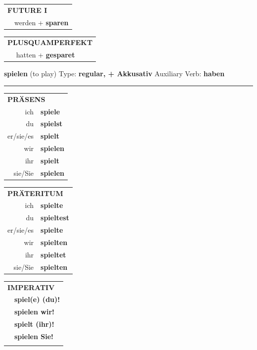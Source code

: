 \documentclass[10pt,a4paper]{revtex4-2}
\begin{document}
\begin{verbbox-acc}
\begin{tabular}{rl}
    \multicolumn{2}{l}{\textbf{FUTURE I} }\\
  &  werden + \textbf{sparen}\\
 
  \end{tabular}
\hfill
   \begin{tabular}{rl}
      \multicolumn{2}{l}{\textbf{PLUSQUAMPERFEKT}}\\
  &  hatten + \textbf{gesparet}\\
  \end{tabular}
  
  \vspace{-5pt}


\end{verbbox-acc}


\begin{verbbox-acc}
    {\Large \bf spielen} (to play) \hfill Type: \textbf{regular, + Akkusativ} \hfill Auxiliary Verb: \textbf{haben} 
    
     \vspace{5pt}

    \hrule
    
    \vspace{5pt}

  \begin{tabular}{rl}
     \multicolumn{2}{l}{\textbf{PRÄSENS} }\\
    ich & \textbf{spiele}\\
    du & \textbf{spielst}\\
    er/sie/es & \textbf{spielt}\\
    wir & \textbf{spielen}\\
    ihr & \textbf{spielt}\\
    sie/Sie & \textbf{spielen}\\
  \end{tabular}
  \hfill
     \begin{tabular}{rl}
    \multicolumn{2}{l}{\textbf{PRÄTERITUM} }\\
    ich & \textbf{spielte}\\
    du & \textbf{spieltest}\\
    er/sie/es & \textbf{spielte}\\
    wir & \textbf{spielten}\\
    ihr & \textbf{spieltet}\\
    sie/Sie & \textbf{spielten}\\
  \end{tabular}
  \hfill
  \begin{tabular}{rl}
     \multicolumn{2}{l}{\textbf{IMPERATIV} }\\
   & \textbf{spiel(e) (du)!}\\
   & \textbf{spielen wir!}\\
   & \textbf{spielt (ihr)!}\\
   & \textbf{spielen Sie!}\\
   & \vspace{10pt}
  \end{tabular}


\end{verbbox-acc}
\end{document}
